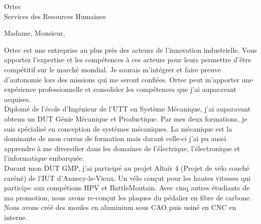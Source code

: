 \documentclass[a4paper,10pt,firstfoot=false]{scrlttr2}
\begin{document}


\begin{letter}{Ortec \\ Services des Resources Humaines}

\pagestyle{empty}
\opening{Madame, Monsieur,}

Ortec est une entreprise au plus près des acteurs de l'innovation industrielle. Vous apportez l'expertise et les compétences à ces acteurs pour leurs permettre d'être compétitif sur le marché mondial. Je saurais m'intégrer et faire preuve d'autonomie lors des missions qui me seront confiées. Ortec peut m'apporter une expérience professionnelle et consolider les compétences que j'ai auparavant acquises.\\

Diplomé de l’école d’Ingénieur de l’UTT en Système Mécanique, j’ai auparavant obtenu un DUT Génie Mécanique et Productique. Par mes deux formations, je suis spécialisé en conception de systèmes mécaniques. La mécanique est la dominante de mon cursus de formation mais durant celle-ci j’ai pu aussi apprendre à me diversifier dans les domaines de l’électrique, l’électronique et l’informatique embarquée.\\

Durant mon DUT GMP, j’ai participé au projet Altaïr 4 (Projet de vélo couché caréné) de l’IUT d’Annecy-le-Vieux. Un vélo conçut pour les hautes vitesses qui participe aux compétions HPV et BattleMoutain. Avec cinq autres étudiants de ma promotion, nous avons re-conçut les plaques du pédalier en fibre de carbone. Nous avons créé des moules en aluminium sous CAO puis usiné en CNC en interne.\\



\end{letter}
\end{document}
